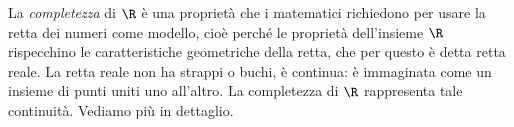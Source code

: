 La \emph{completezza} di \(\R\) è una proprietà che i matematici richiedono per 
usare la retta dei numeri come modello, cioè perché le proprietà dell'insieme 
\(\R\) rispecchino le caratteristiche geometriche della retta, che per questo è 
detta retta reale. La retta reale non ha strappi o buchi, è continua: è 
immaginata come un insieme di punti uniti uno all'altro. La completezza di 
\(\R\) rappresenta tale continuità. Vediamo più in dettaglio.

% 

% 

